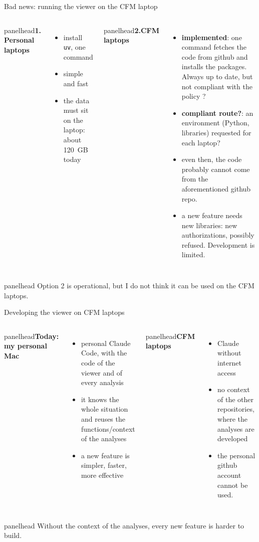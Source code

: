 \documentclass[11pt,aspectratio=169]{beamer}
\newcommand{\panelhead}[1]{%
  \begin{beamercolorbox}[wd=\linewidth,sep=5pt]{panelhead}\textbf{#1}\end{beamercolorbox}\par\vspace{2mm}}
\begin{document}
\begin{frame}{Bad news: running the viewer on the CFM laptop}
\begin{columns}[T,onlytextwidth]
\panelhead{1. Personal laptops}
\begin{itemize}
  \item install \texttt{uv}, one command
  \item simple and fast
  \item the data must sit on the laptop: about 120~GB today
\end{itemize}
\panelhead{2.CFM laptops}
\begin{itemize}
  \item \textbf{implemented}: one command fetches the code from github and installs the packages. Always up to date, but not compliant with the policy ?
  \item \textbf{compliant route?}: an environment (Python, libraries) requested for each laptop?
  \item even then, the code probably cannot come from the aforementioned github repo.
  \item a new feature needs new libraries: new authorizations, possibly refused. Development is limited.
\end{itemize}
\end{columns}
\vfill
\begin{beamercolorbox}[wd=\linewidth,sep=5pt]{panelhead}
Option 2 is operational, but I do not think it can be used on the CFM laptops.
\end{beamercolorbox}
\end{frame}

\begin{frame}{Developing the viewer on CFM laptops}
\begin{columns}[T,onlytextwidth]
\panelhead{Today: my personal Mac}
\begin{itemize}
  \item personal Claude Code, with the code of the viewer and of every analysis
  \item it knows the whole situation and reuses the functions/context of the analyses
  \item a new feature is simpler, faster, more effective
\end{itemize}
\panelhead{CFM laptops}
\begin{itemize}
  \item Claude without internet access
  \item no context of the other repositories, where the analyses are developed
  \item the personal github account cannot be used.
\end{itemize}
\end{columns}
\vfill
\begin{beamercolorbox}[wd=\linewidth,sep=5pt]{panelhead}
Without the context of the analyses, every new feature is harder to build.
\end{beamercolorbox}
\end{frame}
\end{document}
